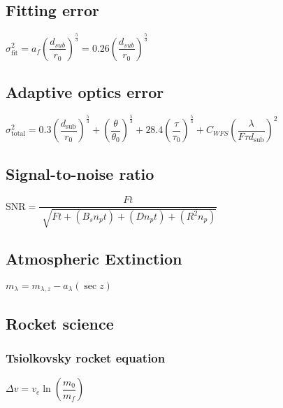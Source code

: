 \subsection{Fitting error}		
\begin{itemize}
\itemt \( \sigma_\mathrm{fit}^2 = a_f (\dfrac{d_{sub}}{r_0})^{\frac{5}{3}} = 0.26 (\dfrac{d_{sub}}{r_0})^{\frac{5}{3}} \)
\end{itemize}

\subsection{Adaptive optics error}
\begin{itemize}
\itemt \( \sigma_\mathrm{total}^2 = 0.3(\dfrac{d_\mathrm{sub}}{r_0})^{\frac{5}{3}} + (\dfrac{\theta}{\theta_0})^{\frac{5}{3}} + 28.4(\dfrac{\tau}{\tau_0})^{\frac{5}{3}} + C_{WFS} (\dfrac{\lambda}{F\tau d_\mathrm{sub}})^2 \)
\end{itemize}
		 
\subsection{Signal-to-noise ratio}
\begin{itemize}
\itemt \( \mathrm{SNR} = \dfrac{Ft}{\sqrt[]{Ft + (B_s n_p t) + (D n_p t) + (R^2 n_p)}} \)
\end{itemize}

\subsection{Atmospheric Extinction}
\begin{itemize}
\itemt \( m_{\lambda} = m_{\lambda,z} - a_\lambda (\sec z) \)
\end{itemize}


\subsection{Rocket science}

\subsubsection{Tsiolkovsky rocket equation}
\begin{itemize}
\itemt \( \Delta v = v_e \ln(\dfrac{m_0}{m_f}) \)
\end{itemize}
